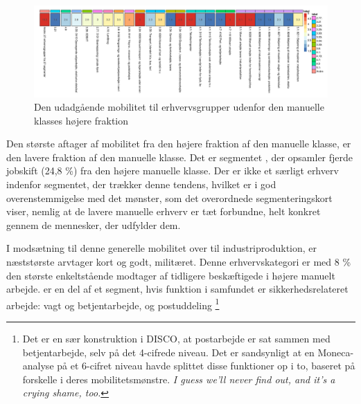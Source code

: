 \begin{landscape}


\begin{figure}[H]
\begin{centering}
  \caption[Manuel klasse, højere: Mobilitet til erhvervsgrupper udenfor klassen]{Den udadgående mobilitet til erhvervsgrupper udenfor den manuelle klasses højere fraktion}
\label{fig delanalyse3 manuelklassehoj without.mob disco}
  \includegraphics[width=\paperwidth]{fig/ma_motor/manuel_seg_hoj.png}
\end{centering}
\end{figure}


Den største aftager af mobilitet fra den højere fraktion af den manuelle klasse, er den lavere fraktion af den manuelle klasse. Det er segmentet , der opsamler fjerde jobskift (24,8 \%) fra den højere manuelle klasse. Der er ikke et særligt erhverv indenfor segmentet, der trækker denne tendens, hvilket er i god overenstemmigelse med det mønster, som det overordnede segmenteringskort viser, nemlig at de lavere manuelle erhverv er tæt forbundne, helt konkret gennem de mennesker, der udfylder dem.

I modsætning til denne generelle mobilitet over til industriproduktion, er næststørste arvtager kort og godt, militæret. Denne erhvervskategori er med 8 \% den største enkeltstående modtager af tidligere beskæftigede i højere manuelt arbejde.  er en del af et segment, hvis funktion i samfundet er sikkerhedsrelateret arbejde: vagt og betjentarbejde, og postuddeling %
%
    \footnote{ Det er en sær konstruktion i DISCO, at postarbejde er sat sammen med betjentarbejde, selv på det 4-cifrede niveau. Det er sandsynligt at en Moneca-analyse på et 6-cifret niveau havde splittet disse funktioner op i to, baseret på forskelle i deres mobilitetsmønstre. \emph{I guess we'll never find out, and it's a crying shame, too.}}%
%
    

\end{landscape}
